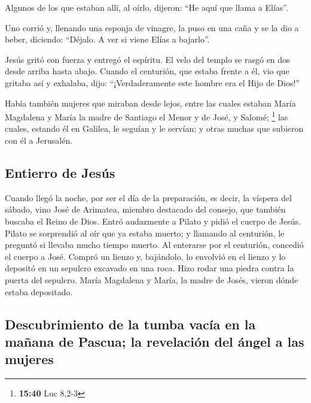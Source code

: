  Algunos de los que estaban allí, al oírlo, dijeron: ``He
aquí que llama a Elías''.

 Uno corrió y, llenando una esponja de vinagre, la puso
en una caña y se la dio a beber, diciendo: ``Déjalo. A ver si viene
Elías a bajarlo''.

 Jesús gritó con fuerza y entregó el espíritu.
 El velo del templo se rasgó en dos desde arriba hasta
abajo.  Cuando el centurión, que estaba frente a él, vio
que gritaba así y exhalaba, dijo: ``¡Verdaderamente este hombre era el
Hijo de Dios!''

 Había también mujeres que miraban desde lejos, entre las
cuales estaban María Magdalena y María la madre de Santiago el Menor y
de José, y Salomé; \footnote{\textbf{15:40} Luc 8,2-3} 
las cuales, estando él en Galilea, le seguían y le servían; y otras
muchas que subieron con él a Jerusalén.

\hypertarget{entierro-de-jesuxfas}{%
\subsection{Entierro de Jesús}\label{entierro-de-jesuxfas}}

 Cuando llegó la noche, por ser el día de la preparación,
es decir, la víspera del sábado,  vino José de Arimatea,
miembro destacado del consejo, que también buscaba el Reino de Dios.
Entró audazmente a Pilato y pidió el cuerpo de Jesús. 
Pilato se sorprendió al oír que ya estaba muerto; y llamando al
centurión, le preguntó si llevaba mucho tiempo muerto. 
Al enterarse por el centurión, concedió el cuerpo a José.
 Compró un lienzo y, bajándolo, lo envolvió en el lienzo
y lo depositó en un sepulcro excavado en una roca. Hizo rodar una piedra
contra la puerta del sepulcro.  María Magdalena y María,
la madre de Josés, vieron dónde estaba depositado.

\hypertarget{descubrimiento-de-la-tumba-vacuxeda-en-la-mauxf1ana-de-pascua-la-revelaciuxf3n-del-uxe1ngel-a-las-mujeres}{%
\subsection{Descubrimiento de la tumba vacía en la mañana de Pascua; la
revelación del ángel a las
mujeres}\label{descubrimiento-de-la-tumba-vacuxeda-en-la-mauxf1ana-de-pascua-la-revelaciuxf3n-del-uxe1ngel-a-las-mujeres}}

